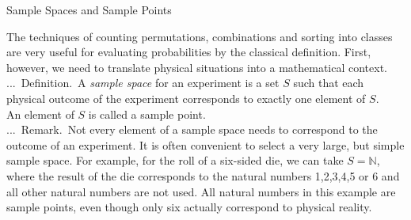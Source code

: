 \documentclass[smaller,hyperref={CJKbookmarks=true}]{beamer}
\newcommand{\N}{\mathbb{N}} \newcommand{\Z}{\mathbb{Z}} \newcommand{\Q}{\mathbb{Q}}
\newcounter{zhuo}[subsection]
\renewcommand{\thezhuo}{\thesection.\thesubsection.\arabic{zhuo}}
\newenvironment{DEFINITION}{\stepcounter{zhuo}\alert{\thezhuo.~Definition.\,}}{}
\newenvironment{REMARK}{\stepcounter{zhuo}\alert{\thezhuo.~Remark.\,}}{}
\begin{document}
\begin{frame}[t]{Sample Spaces and Sample Points}
\begin{spacing}{1.1}
The techniques of counting permutations, combinations and sorting into
classes are very useful for evaluating probabilities by the classical
definition. First, however, we need to translate physical situations into a
mathematical context.\\[5pt]
\begin{DEFINITION}
A \emph{sample space} for an experiment is a set $S$ such that
each physical outcome of the experiment corresponds to exactly one
element of $S$.\\[5pt]
An element of $S$ is called a sample point.\\[6pt]
\end{DEFINITION}
\begin{REMARK}
Not every element of a sample space needs to correspond
to the outcome of an experiment. It is often convenient to select a very
large, but simple sample space. For example, for the roll of a six-sided die,
we can take $S = \N$, where the result of the die corresponds to the natural
numbers 1,2,3,4,5 or 6 and all other natural numbers are not used. All
natural numbers in this example are sample points, even though only six
actually correspond to physical reality.
\end{REMARK}
\end{spacing}
\end{frame}
\end{document}
